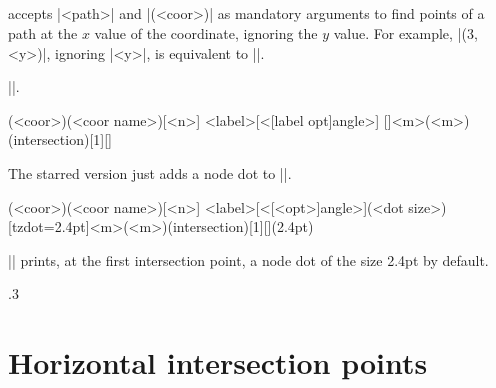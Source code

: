 \subsection{\protect\cmd{\tzvXpoint(*)}}
\label{ss:tzvXpoint}

\icmd{\tzvXpoint} accepts |{<path>}| and |(<coor>)| as mandatory arguments to find  points of a path at the $x$ value of the coordinate, ignoring the $y$ value.
For example, |(3,<y>)|, ignoring |<y>|, is equivalent to ||.

 |\tzvXpointat|.

\begin{tzdef}{}
(<coor>)(<coor name>)[<n>]
          {<label>}[<[label opt]angle>]
  []{<m>}(<m>)(intersection)[1]{}[]
\end{tzdef}

The starred version \icmd{\tzvXpoint*} just adds a node dot to |\tzvXpoint|.

\begin{tzdef}{}
(<coor>)(<coor name>)[<n>]
           {<label>}[<[<opt>]angle>](<dot size>)
  [tzdot=2.4pt]{<m>}(<m>)(intersection)[1]{}[](2.4pt)
\end{tzdef}

|\tzvXpoint*| prints, at the first intersection point, a node dot of the size 2.4pt by default.

\begin{tzcode}{.3}
\end{tzcode}



\section{Horizontal intersection points}
\label{s:tzhXpointat}

\subsection{\protect\cmd{\tzhXpointat(*)}}
\label{ss:tzhXpointat}

